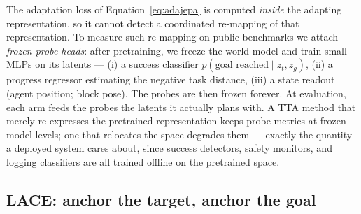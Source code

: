 \documentclass{article}
\newcommand{\lace}{\textsc{LACE}}
\begin{document}
The adaptation loss of Equation~\eqref{eq:adajepa} is computed \emph{inside}
the adapting representation, so it cannot detect a coordinated re-mapping of
that representation. To measure such re-mapping on public benchmarks we
attach \emph{frozen probe heads}: after pretraining, we freeze the world model
and train small MLPs on its latents --- (i) a success classifier
$p(\text{goal reached} \mid z_t, z_g)$, (ii) a progress regressor estimating
the negative task distance, (iii) a state readout (agent position; block
pose). The probes are then frozen forever. At evaluation, each arm feeds the
probes the latents it actually plans with. A TTA method that merely
re-expresses the pretrained representation keeps probe metrics at
frozen-model levels; one that relocates the space degrades them --- exactly the
quantity a deployed system cares about, since success detectors, safety
monitors, and logging classifiers are all trained offline on the pretrained
space.

\subsection{\lace: anchor the target, anchor the goal}
\end{document}

